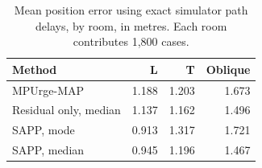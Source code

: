 \begin{table}[ht]
\centering
\caption{Mean position error using exact simulator path delays, by room, in metres. Each room contributes 1,800 cases.}
\label{tab:rawrooms}
\begin{tabular}{lrrr}
\toprule
Method & L & T & Oblique\\
\midrule
MPUrge-MAP & 1.188 & 1.203 & 1.673\\
Residual only, median & 1.137 & 1.162 & 1.496\\
SAPP, mode & 0.913 & 1.317 & 1.721\\
SAPP, median & 0.945 & 1.196 & 1.467\\
\bottomrule
\end{tabular}
\end{table}
